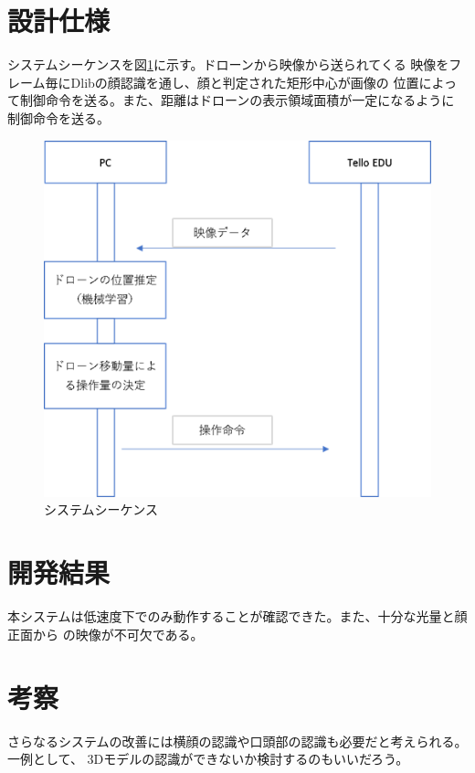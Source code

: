 \documentclass[uplatex]{jsarticle}
\begin{document}
\section{設計仕様}
システムシーケンスを図\ref{fig:sequence}に示す。ドローンから映像から送られてくる
映像をフレーム毎にDlibの顔認識を通し、顔と判定された矩形中心が画像の
位置によって制御命令を送る。また、距離はドローンの表示領域面積が一定になるように
制御命令を送る。
\begin{figure}[]
    \centering
    \includegraphics{sequence.png}
    \caption{システムシーケンス}
    \label{fig:sequence}
\end{figure}  
\section{開発結果}
本システムは低速度下でのみ動作することが確認できた。また、十分な光量と顔正面から
の映像が不可欠である。
\section{考察}
さらなるシステムの改善には横顔の認識や口頭部の認識も必要だと考えられる。一例として、
3Dモデルの認識ができないか検討するのもいいだろう。



\end{document}
